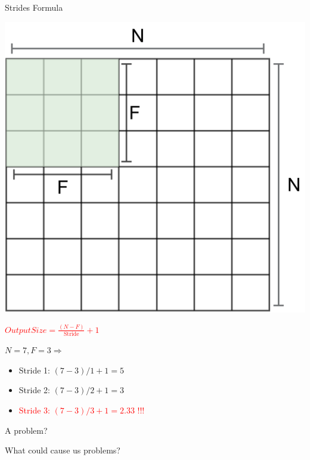 \documentclass[default, aspectratio=169]{beamer}
\begin{document}
	
\begin{frame}{Strides Formula}
	
	\begin{minipage}{0.4\textwidth}
		\centering
		\includegraphics[keepaspectratio, scale=0.25]{pic/Stride12.png}
	\end{minipage}%
	\hspace{0.5cm}  %
	\begin{minipage}{0.55\textwidth}
		\textcolor{red}{\large $Output Size = \frac{(N - F)}{\text{Stride}} + 1$}
		
		\vspace{0.3cm}
		
		\( N = 7, F = 3 \Rightarrow \)
		\begin{itemize}
			\item Stride 1: \( (7 - 3) / 1 + 1 = 5 \)
			\item Stride 2: \( (7 - 3) / 2 + 1 = 3 \)
			\item \textcolor{red}{Stride 3: \( (7 - 3) / 3 + 1 = 2.33 \) !!!}
		\end{itemize}
	\end{minipage}
	
\end{frame}

	
	\begin{frame}{A problem?}
		\begin{center}
			\LARGE What could cause us problems?
		\end{center}
	\end{frame}
	
\end{document}
